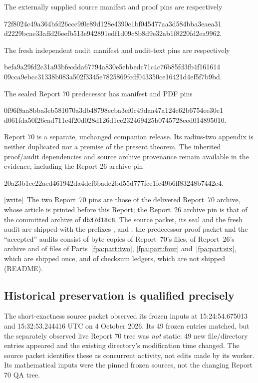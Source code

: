 \documentclass[11pt,a4paper]{article}
\numberwithin{equation}{section}
\newcommand{\file}[1]{\texttt{\detokenize{#1}}}
\newcommand{\wtag}{\textup{[write]}}
\begin{document}
The externally supplied source manifest and proof pins are respectively
\begin{center}\footnotesize\ttfamily
72f8024c49a364bfd26ccc9f0e89d128e4390c1bf045477aa3d584bba3eaea31\\
d2229bcae33affd26eefb513e942891edf1d09c8b8d9e32ab1f8220fd2ea9962.
\end{center}
The fresh independent audit manifest and audit-text pins are respectively
\begin{center}\footnotesize\ttfamily
befa9a29fd2c31a93bfecdda67794a830e5ebbedc71c4c76b85fd3fb4f161614\\
09cca9ebcc31338b083a502f3345e7825869fcdf043350ce16421d4ef5f7b9bd.
\end{center}
The sealed Report 70 predecessor has manifest and PDF pins
\begin{center}\footnotesize\ttfamily
0f96f8aa8bba3eb581070a3db48798ecba3ef0c49daa47a124e62b6754ee30e1\\
d061fda50f26cad711e4f20d028d126d1ce232469425b0745728eed014895010.
\end{center}
Report 70 is a separate, unchanged companion release. Its radius-two appendix is neither duplicated nor a premise of the present theorem. The inherited proof/audit dependencies and source archive provenance remain available in the evidence, including the Report 26 archive pin
\begin{center}\footnotesize\ttfamily
20a23b1ee22aed461942da4def6bade2bd55d777fce1fe49b6ff83248b7442e4.
\end{center}

\wtag\ The two Report~70 pins are those of the delivered Report~70 archive, whose article is printed before this Report; the Report~26 archive pin is that of the committed archive of \texttt{db37d18c8}. The source packet, its seal and the fresh audit are shipped with the prefixes ,  and ; the predecessor proof packet and the ``accepted'' audits consist of byte copies of Report~70's files, of Report~26's archive and of files of Parts~\ref{fpa:part:two}, \ref{fpa:part:four} and~\ref{fpa:part:six}, which are shipped once, and of checksum ledgers, which are not shipped (README).

\subsection{Historical preservation is qualified precisely}
The short-exactness source packet observed its frozen inputs at 15:24:54.675013 and 15:32:53.244416 UTC on 4 October 2026. Its 49 frozen entries matched, but the separately observed live Report 70 tree was \emph{not} static: 49 new file/directory entries appeared and the existing \file{qa} directory's modification time changed. The source packet identifies these as concurrent activity, not edits made by its worker. Its mathematical inputs were the pinned frozen sources, not the changing Report 70 QA tree.
\end{document}
